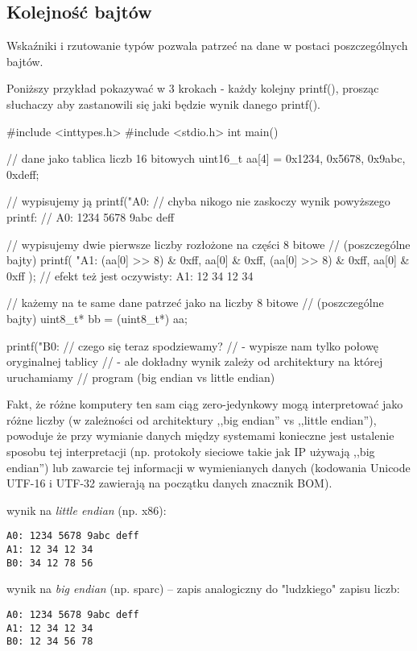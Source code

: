 \documentclass{pdfBooklets}
\begin{document}
\subsection{Kolejność bajtów}

Wskaźniki i rzutowanie typów pozwala patrzeć na dane w postaci poszczególnych bajtów.

\begin{teacherOnly}
Poniższy przykład pokazywać w 3 krokach - każdy kolejny printf(), prosząc słuchaczy aby zastanowili się jaki będzie wynik danego printf().
\end{teacherOnly}

\begin{CodeFrame*}[c]{}
#include <inttypes.h>
#include <stdio.h>
int main() {
    // dane jako tablica liczb 16 bitowych
    uint16_t aa[4] = {0x1234, 0x5678, 0x9abc, 0xdeff};
    
    // wypisujemy ją
    printf("A0: %
    // chyba nikogo nie zaskoczy wynik powyższego printf:
    //   A0: 1234 5678 9abc deff
    
    // wypisujemy dwie pierwsze liczby rozłożone na części 8 bitowe
    // (poszczególne bajty)
    printf(
        "A1: %
        (aa[0] >> 8) & 0xff, aa[0] & 0xff,
        (aa[0] >> 8) & 0xff, aa[0] & 0xff
    );
    // efekt też jest oczywisty:  A1: 12 34 12 34
    
    // każemy na te same dane patrzeć jako na liczby 8 bitowe
    // (poszczególne bajty)
    uint8_t* bb = (uint8_t*) aa;
    
    printf("B0: %
    // czego się teraz spodziewamy?
    //  - wypisze nam tylko połowę oryginalnej tablicy
    //  - ale dokładny wynik zależy od architektury na której uruchamiamy
    //    program (big endian vs little endian)
}
\end{CodeFrame*}

Fakt, że różne komputery ten sam ciąg zero-jedynkowy mogą interpretować jako różne liczby (w zależności od architektury ,,big endian'' vs ,,little endian''), powoduje że przy wymianie danych między systemami konieczne jest ustalenie sposobu tej interpretacji (np. protokoły sieciowe takie jak IP używają ,,big endian'') lub zawarcie tej informacji w wymienianych danych (kodowania Unicode UTF-16 i UTF-32 zawierają na początku danych znacznik BOM).

\begin{teacherOnly}
\begin{minipage}[t]{0.38\textwidth}
wynik na \emph{little endian} (np. x86):
\begin{Verbatim}
A0: 1234 5678 9abc deff
A1: 12 34 12 34
B0: 34 12 78 56
\end{Verbatim}
\end{minipage}
\hfill
\begin{minipage}[t]{0.58\textwidth}
wynik na \emph{big endian} (np. sparc) – zapis analogiczny do "ludzkiego" zapisu liczb:
\begin{Verbatim}
A0: 1234 5678 9abc deff
A1: 12 34 12 34
B0: 12 34 56 78
\end{Verbatim}
\end{minipage}
\end{teacherOnly}
\end{document}
